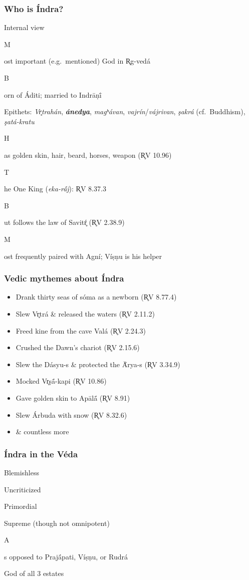 \documentclass[pdf]{beamer}
\newcommand{\Subitem}[1]{{\setlength\itemindent{12pt} \item[-] #1}}
\newcommand{\Subsubitem}[1]{{\setlength\itemindent{24pt} \item[○] #1}}
\begin{document}
\begin{frame} \frametitle{Who is Índra?}
\begin{itemize}
	\item Internal view
	\Subitem Most important (e.g.~mentioned) God in R̥g-vedá
	\Subitem Born of Áditi; married to Indrāṇī́
	\Subitem {Epithets: \textit{Vr̥trahán}, \textbf{\textit{ánedya}}, \textit{magʰávan}, \textit{vajrín}/\textit{vájrivan}, \textit{şakrá} (cf.~Buddhism), \textit{şatá-kratu}}
	\Subitem Has golden skin, hair, beard, horses, weapon (R̥V 10.96)
	\Subitem The One King (\textit{eka-rā́j}): R̥V 8.37.3
	\Subsubitem But follows the law of Savitŕ̥ (R̥V 2.38.9)
	\Subitem Most frequently paired with Agní; Víṣṇu is his helper
\end{itemize}
\end{frame}

\begin{frame} \frametitle{Vedic mythemes about Índra}
\begin{itemize}
	\item Drank thirty seas of sóma as a newborn (R̥V 8.77.4)
	\item Slew Vr̥trá \& released the waters (R̥V 2.11.2)
	\item Freed kine from the cave Valá (R̥V 2.24.3)
	\item Crushed the Dawn's chariot (R̥V 2.15.6)
	\item Slew the Dásyu-s \& protected the Ā́rya-s (R̥V 3.34.9)
	\item Mocked Vr̥ṣā́-kapi (R̥V 10.86)
	\item Gave golden skin to Apālā́ (R̥V 8.91)
	\item Slew Árbuda with snow (R̥V 8.32.6)
	\item \& countless more
\end{itemize}
\end{frame}

\begin{frame} \frametitle{Índra in the Véda}
\begin{itemize}
	\item Blemishless
	\item Uncriticized
	\item Primordial
	\item Supreme (though not omnipotent)
	\Subitem As opposed to Prajā́pati, Víṣṇu, or Rudrá
	\item God of all 3 estates
\end{itemize}
\end{frame}
\end{document}
